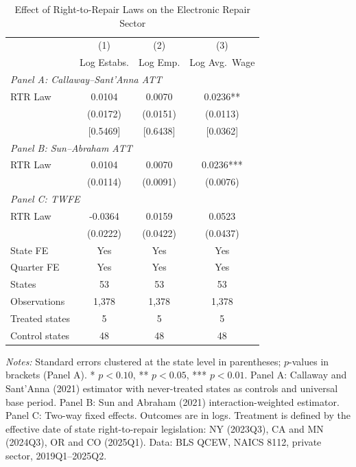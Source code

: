 \begin{table}[H]
\centering
\caption{Effect of Right-to-Repair Laws on the Electronic Repair Sector}
\label{tab:main}
\begin{threeparttable}
\begin{tabular}{lccc}
\toprule
 & (1) & (2) & (3) \\
 & Log Estabs. & Log Emp. & Log Avg.\ Wage \\
\midrule
\multicolumn{4}{l}{\textit{Panel A: Callaway--Sant'Anna ATT}} \\[0.3em]
RTR Law & 0.0104 & 0.0070 & 0.0236** \\
 & (0.0172) & (0.0151) & (0.0113) \\
 & [0.5469] & [0.6438] & [0.0362] \\[0.5em]
\multicolumn{4}{l}{\textit{Panel B: Sun--Abraham ATT}} \\[0.3em]
RTR Law & 0.0104 & 0.0070 & 0.0236*** \\
 & (0.0114) & (0.0091) & (0.0076) \\[0.5em]
\multicolumn{4}{l}{\textit{Panel C: TWFE}} \\[0.3em]
RTR Law & -0.0364 & 0.0159 & 0.0523 \\
 & (0.0222) & (0.0422) & (0.0437) \\
\midrule
State FE & Yes & Yes & Yes \\
Quarter FE & Yes & Yes & Yes \\
States & 53 & 53 & 53 \\
Observations & 1,378 & 1,378 & 1,378 \\
Treated states & 5 & 5 & 5 \\
Control states & 48 & 48 & 48 \\
\bottomrule
\end{tabular}
\begin{tablenotes}[flushleft]
\small
\item \textit{Notes:} Standard errors clustered at the state level in parentheses; $p$-values in brackets (Panel A). * $p<0.10$, ** $p<0.05$, *** $p<0.01$. Panel A: Callaway and Sant'Anna (2021) estimator with never-treated states as controls and universal base period. Panel B: Sun and Abraham (2021) interaction-weighted estimator. Panel C: Two-way fixed effects. Outcomes are in logs. Treatment is defined by the effective date of state right-to-repair legislation: NY (2023Q3), CA and MN (2024Q3), OR and CO (2025Q1). Data: BLS QCEW, NAICS 8112, private sector, 2019Q1--2025Q2.
\end{tablenotes}
\end{threeparttable}
\end{table}
